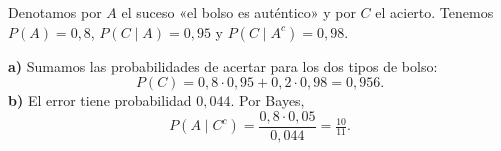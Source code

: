 Denotamos por $A$ el suceso «el bolso es auténtico» y por $C$ el acierto. Tenemos $P(A)=0{,}8$, $P(C\mid A)=0{,}95$ y $P(C\mid A^c)=0{,}98$.

\textbf{a)} Sumamos las probabilidades de acertar para los dos tipos de bolso:
\[
P(C)=0{,}8\cdot0{,}95+0{,}2\cdot0{,}98=\boxed{0{,}956}.
\]
\textbf{b)} El error tiene probabilidad $0{,}044$. Por Bayes,
\[
P(A\mid C^c)=\frac{0{,}8\cdot0{,}05}{0{,}044}=\boxed{\tfrac{10}{11}}.
\]
